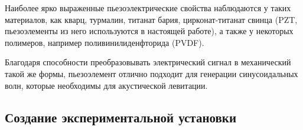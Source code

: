 Наиболее ярко выраженные пьезоэлектрические свойства наблюдаются у таких материалов, как кварц, турмалин, титанат бария, цирконат-титанат свинца (PZT, пьезоэлементы из него используются в настоящей работе), а также у некоторых полимеров, например поливинилиденфторида (PVDF).

Благодаря способности преобразовывать электрический сигнал в механический такой же формы, пьезоэлемент отлично подходит для генерации синусоидальных волн, которые необходимы для акустической левитации.
\subsection{Создание экспериментальной установки}

\newpage
